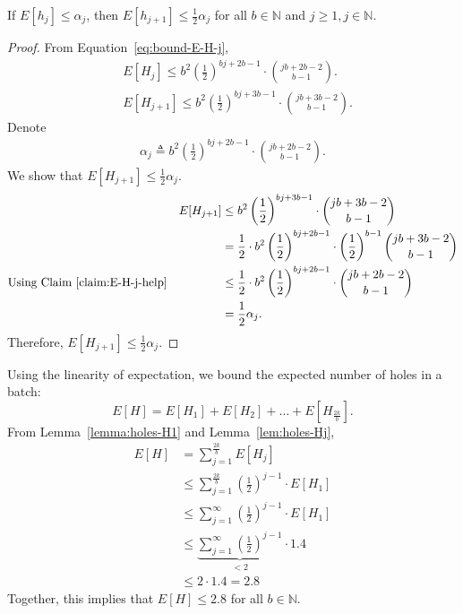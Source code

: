 \begin{lemma} \label{lem:holes-Hj}
If $E[h_j] \leq \alpha_{j}$, then $E[h_{j+1}] \leq \frac{1}{2}\alpha_{j}$ for all $b\in \mathds{N}$ and $j\geq1, j\in \mathds{N}$. 
\end{lemma}
\begin{proof}
From Equation~\ref{eq:bound-E-H-j},
\begin{align}
&E[H_j] \leq b^2 \left(\frac{1}{2}\right)^{bj+2b -1} \cdot {{jb+2b-2} \choose {b-1}}. \\
&E[H_{j+1}] \leq b^2 \left(\frac{1}{2}\right)^{bj+3b -1} \cdot {{jb+3b-2} \choose {b-1}}. 
\end{align}
Denote
\begin{align}
        \alpha_j \triangleq b^2 \left(\frac{1}{2}\right)^{bj+2b -1} \cdot {{jb+2b-2} \choose {b-1}}.
\end{align}
We show that $E[H_{j+1}] \leq \frac{1}{2}\alpha_j$.
\begin{align}
&& E[H_{j+1}] &\leq b^2 \left(\frac{1}{2}\right)^{bj+3b -1} \cdot {{jb+3b-2} \choose {b-1}} \\ &&              &= \frac{1}{2} \cdot b^2 \left(\frac{1}{2}\right)^{bj+2b -1} \cdot \left(\frac{1}{2}\right)^{b-1} {{jb+3b-2} \choose {b-1}} \\
\text{Using Claim~\ref{claim:E-H-j-help}}&&              &\leq \frac{1}{2} \cdot b^2 \left(\frac{1}{2}\right)^{bj+2b -1} \cdot {{jb+2b-2} \choose {b-1}} \\
&&              &= \frac{1}{2}\alpha_j.
\end{align}
Therefore, $E[H_{j+1}] \leq \frac{1}{2}\alpha_j$.
\end{proof}
Using the linearity of expectation, we bound the expected number of holes in a batch:
\[E\left[H\right]= E\left[H_1\right] + E\left[H_2\right] + \dots + E\left[H_{\frac{2k}{b}}\right]. \]
From Lemma~\ref{lemma:holes-H1} and Lemma~\ref{lem:holes-Hj}, 
\begin{align}
    E[H] &= \sum_{j=1}^{\frac{2k}{b}} E[H_j] \\
        &\leq  \sum_{j=1}^{\frac{2k}{b}} \left(\frac{1}{2}\right)^{j-1}\cdot E[H_1] \\
        &\leq  \sum_{j=1}^{\infty} \left(\frac{1}{2}\right)^{j-1}\cdot E[H_1] \\
        &\leq  \underbrace{\sum_{j=1}^{\infty} \left(\frac{1}{2}\right)^{j-1}}_{<2}\cdot 1.4 \\
        &\leq 2\cdot 1.4 = 2.8
\end{align}
Together, this implies that  $E[H] \leq 2.8$ for all $b \in \mathds{N}$.

